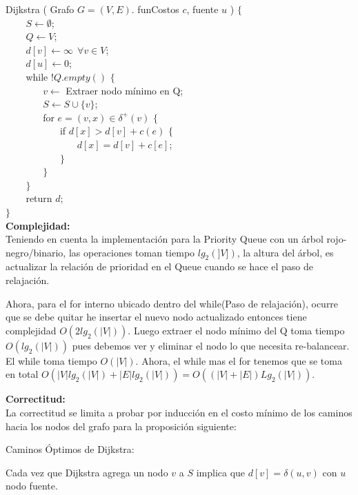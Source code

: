 \documentclass[a4paper,12pt]{article}
\begin{document}
\begin{itemize}
Dijkstra ( Grafo $G=(V,E)$. funCostos $c$, fuente $u$ ) $\{$ \\
$~~~~~~~~$ $S \leftarrow \emptyset$; \\
$~~~~~~~~$ $Q \leftarrow V$; \\
$~~~~~~~~$ $d[v] \leftarrow \infty ~~ \forall v \in V$;\\
$~~~~~~~~$ $d[u] \leftarrow 0$;\\
$~~~~~~~~$ while $!Q.empty()$ $\{$\\
$~~~~~~~~~~~~~~~~$ $v \leftarrow$ Extraer nodo mínimo en Q;\\
$~~~~~~~~~~~~~~~~$ $S \leftarrow S \cup \{v\}$;\\
$~~~~~~~~~~~~~~~~$ for $e = (v,x) \in \delta^+(v)$ $\{$\\
$~~~~~~~~~~~~~~~~~~~~~~~~$ if $d[x] > d[v]+c(e)$ $\{$\\
$~~~~~~~~~~~~~~~~~~~~~~~~~~~~~~~~$ $d[x]=d[v]+c[e]$;\\
$~~~~~~~~~~~~~~~~~~~~~~~~$ $\}$\\
$~~~~~~~~~~~~~~~~$ $\}$\\
$~~~~~~~~$ $\}$\\
$~~~~~~~~$ return $d$;\\
$\}$\\

\textbf{Complejidad:} \\ 
Teniendo en cuenta la implementación para la Priority Queue con un árbol rojo-negro/binario, las operaciones toman tiempo $lg_2(]V])$, la altura del árbol, es actualizar la relación de prioridad en el Queue cuando se hace el paso de relajación.

Ahora, para el for interno ubicado dentro del while(Paso de relajación), ocurre que se debe quitar he insertar el nuevo nodo actualizado entonces tiene complejidad $O(2lg_2(|V|))$. Luego extraer el nodo mínimo del Q toma tiempo $O(lg_2(|V|))$ pues debemos ver y eliminar el nodo lo que necesita re-balancear. El while toma tiempo $O(|V|)$.  Ahora, el while mas el for tenemos que se toma en total $O(|V|lg_2(|V|)+|E|lg_2(|V|))= O((|V|+|E|)Lg_2(|V|))$.

\textbf{Correctitud:}\\
La correctitud se limita a probar por inducción en el costo mínimo de los caminos hacia los nodos del grafo para la proposición siguiente:
\begin{center}
\begin{center} Caminos Óptimos de Dijkstra: \end{center} Cada vez que Dijkstra agrega un nodo $v$ a $S$ implica que $d[v]=\delta(u,v)$ con $u$ nodo fuente.
\end{center}


\end{itemize}
\end{document}
